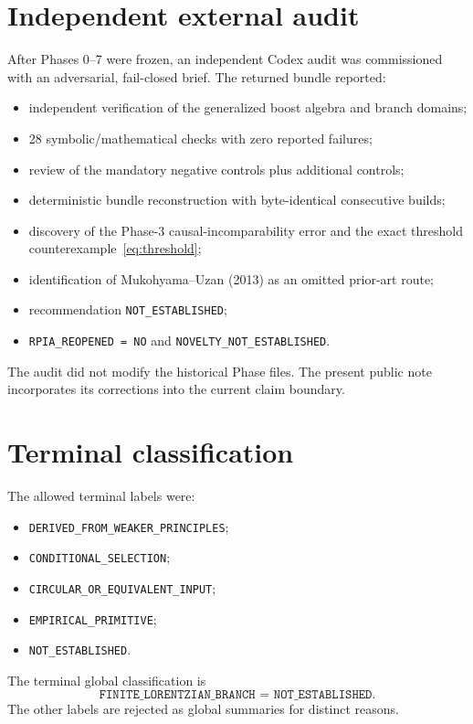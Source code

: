 \documentclass[11pt,a4paper]{article}
\newcommand{\status}[1]{\texttt{#1}}
\begin{document}
\section{Independent external audit}
After Phases 0--7 were frozen, an independent Codex audit was commissioned with an adversarial, fail-closed brief.  The returned bundle reported:
\begin{itemize}
\item independent verification of the generalized boost algebra and branch domains;
\item 28 symbolic/mathematical checks with zero reported failures;
\item review of the mandatory negative controls plus additional controls;
\item deterministic bundle reconstruction with byte-identical consecutive builds;
\item discovery of the Phase-3 causal-incomparability error and the exact threshold counterexample~\eqref{eq:threshold};
\item identification of Mukohyama--Uzan (2013) as an omitted prior-art route;
\item recommendation \status{NOT\_ESTABLISHED};
\item \status{RPIA\_REOPENED = NO} and \status{NOVELTY\_NOT\_ESTABLISHED}.
\end{itemize}
The audit did not modify the historical Phase files.  The present public note incorporates its corrections into the current claim boundary.

\section{Terminal classification}
The allowed terminal labels were:
\begin{itemize}
\item \status{DERIVED\_FROM\_WEAKER\_PRINCIPLES};
\item \status{CONDITIONAL\_SELECTION};
\item \status{CIRCULAR\_OR\_EQUIVALENT\_INPUT};
\item \status{EMPIRICAL\_PRIMITIVE};
\item \status{NOT\_ESTABLISHED}.
\end{itemize}
The terminal global classification is
\begin{equation}
\boxed{\status{FINITE\_LORENTZIAN\_BRANCH = NOT\_ESTABLISHED}.}
\end{equation}
The other labels are rejected as global summaries for distinct reasons.
\end{document}
